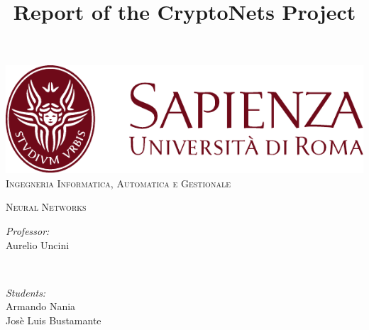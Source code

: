 \documentclass[a4paper]{article}
\begin{document}
\title{Report of the CryptoNets Project}

\makeatletter
\let\thetitle\@title
\let\theauthor\@author
\let\thedate\@date
\makeatother

\begin{titlepage}
	\centering
    \vspace*{0.5 cm}
    \includegraphics[scale = 0.75]{images/SapienzaLogo}\\[1.0 cm]	%
    \vspace*{-0.3cm}
    \textsc{\large Ingegneria Informatica, Automatica e Gestionale}\\[2.0 cm]	%
    \vspace*{1.2cm}
    { \fontsize{20.74pt}{18.5pt}\selectfont\bfseries \thetitle \par } %
    \vspace*{0.1cm}
    \textsc{\Large Neural Networks}\\[0.5 cm] %
    \vspace*{5.6cm}
	\begin{minipage}{0.4\textwidth}
		\begin{flushleft} \large
			\emph{Professor:}\\
			Aurelio Uncini\\
		\end{flushleft}
	\end{minipage}~
	\begin{minipage}{0.4\textwidth}
		\begin{flushright} \large
			\emph{Students:} \\
            Armando Nania\\
            Josè Luis Bustamante
		\end{flushright}
	\end{minipage}\\[2 cm]
\end{titlepage}


\tableofcontents
\newpage




\clearpage


\clearpage


\clearpage






\clearpage



\end{document}

